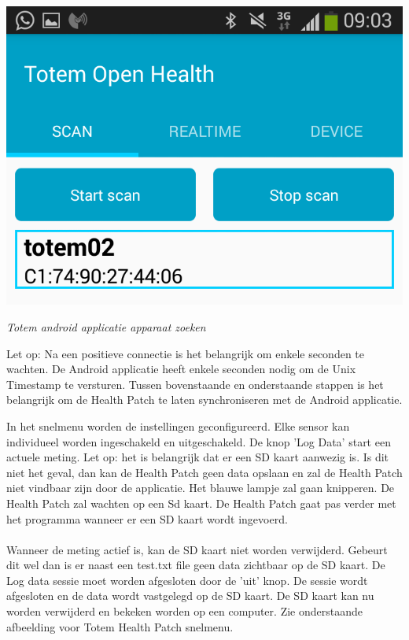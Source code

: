\documentclass[conference]{IEEEtran}
\begin{document}
\begin{center}
    \includegraphics[scale=0.4]{apk2}
    \begin{minipage}{0.6\textwidth}
    \footnotesize
    \emph{Totem android applicatie apparaat zoeken}
    \end{minipage}
\end{center}

Let op: Na een positieve connectie is het belangrijk om enkele seconden te wachten. De Android applicatie heeft enkele seconden nodig om de Unix Timestamp te versturen. Tussen bovenstaande en onderstaande stappen is het belangrijk om de Health Patch te laten synchroniseren met de Android applicatie. 
 
\newpage
In het snelmenu worden de instellingen geconfigureerd. Elke sensor kan individueel worden ingeschakeld en uitgeschakeld. De knop 'Log Data' start een actuele meting. Let op: het is belangrijk dat er een SD kaart aanwezig is. Is dit niet het geval, dan kan de Health Patch geen data opslaan en zal de Health Patch niet vindbaar zijn door de applicatie. Het blauwe lampje zal gaan knipperen. De Health Patch zal wachten op een Sd kaart. De Health Patch gaat pas verder met het programma wanneer er een SD kaart wordt ingevoerd.\\\\Wanneer de meting actief is, kan de SD kaart niet worden verwijderd. Gebeurt dit wel dan is er naast een test.txt file geen data zichtbaar op de SD kaart. De Log data sessie moet worden afgesloten door de 'uit' knop. De sessie wordt afgesloten en de data wordt vastgelegd op de SD kaart. De SD kaart kan nu worden verwijderd en bekeken worden op een computer. Zie onderstaande afbeelding voor Totem Health Patch snelmenu. 
 
\end{document}
